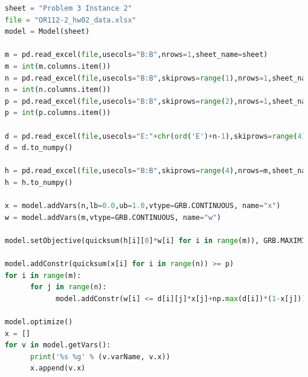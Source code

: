 \documentclass[12pt]{article}
\begin{document}
\begin{enumerate}
\begin{enumerate}
\begin{lstlisting}[language=Python]
sheet = "Problem 3 Instance 2"
file = "OR112-2_hw02_data.xlsx"
model = Model(sheet)

m = pd.read_excel(file,usecols="B:B",nrows=1,sheet_name=sheet)
m = int(m.columns.item())
n = pd.read_excel(file,usecols="B:B",skiprows=range(1),nrows=1,sheet_name=sheet)
n = int(n.columns.item())
p = pd.read_excel(file,usecols="B:B",skiprows=range(2),nrows=1,sheet_name=sheet)
p = int(p.columns.item())

d = pd.read_excel(file,usecols="E:"+chr(ord('E')+n-1),skiprows=range(4),nrows=m,sheet_name=sheet)
d = d.to_numpy()

h = pd.read_excel(file,usecols="B:B",skiprows=range(4),nrows=m,sheet_name=sheet)
h = h.to_numpy()

x = model.addVars(n,lb=0.0,ub=1.0,vtype=GRB.CONTINUOUS, name="x")
w = model.addVars(m,vtype=GRB.CONTINUOUS, name="w")

model.setObjective(quicksum(h[i][0]*w[i] for i in range(m)), GRB.MAXIMIZE)

model.addConstr(quicksum(x[i] for i in range(n)) >= p)
for i in range(m):
      for j in range(n):
            model.addConstr(w[i] <= d[i][j]*x[j]+np.max(d[i])*(1-x[j]))

model.optimize()
x = []
for v in model.getVars():
      print('%s %g' % (v.varName, v.x))
      x.append(v.x)


\end{lstlisting}
\end{enumerate}
\end{enumerate}
\end{document}
